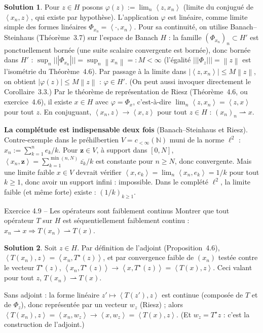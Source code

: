 \documentclass[11pt,a4paper]{article}
\newcommand{\N}{\mathbb{N}}
\newcommand{\norm}[1]{\left\|#1\right\|}
\newcommand{\opnorm}[1]{|\!|\!|#1|\!|\!|}
\newcommand{\ie}{c'est-à-dire}
\newcommand{\ps}[2]{\left\langle #1,#2\right\rangle}
\theoremstyle{definition}
\newtheorem*{solution}{Solution}
\begin{document}
\begin{solution}
Pour $z\in H$ posons $\varphi(z):=\lim_n\ps z{x_n}$ (limite du conjugué de $\ps{x_n}z$, qui existe par hypothèse). L'application $\varphi$ est linéaire, comme limite simple des formes linéaires $\Phi_{x_n}=\ps\cdot{x_n}$. Pour sa continuité, on utilise Banach--Steinhaus (Théorème~3.7) sur l'espace de Banach $H$ : la famille $(\Phi_{x_n})_n\subset H'$ est ponctuellement bornée (une suite scalaire convergente est bornée), donc bornée dans $H'$ : $\sup_n\opnorm{\Phi_{x_n}}=\sup_n\norm{x_n}=:M<\infty$ (l'égalité $\opnorm{\Phi_z}=\norm z$ est l'isométrie du Théorème~4.6). Par passage à la limite dans $|\ps z{x_n}|\le M\norm z$, on obtient $|\varphi(z)|\le M\norm z$ : $\varphi\in H'$. (On peut aussi invoquer directement le Corollaire~3.3.) Par le théorème de représentation de Riesz (Théorème~4.6, ou exercice~4.6), il existe $x\in H$ avec $\varphi=\Phi_x$, \ie{} $\lim_n\ps z{x_n}=\ps zx$ pour tout $z$. En conjuguant, $\ps{x_n}z\to\ps xz$ pour tout $z\in H$ : $(x_n)_n\rightharpoonup x$.
\end{solution}

\begin{piege}
\textbf{La complétude est indispensable deux fois} (Banach--Steinhaus et Riesz). Contre-exemple dans le préhilbertien $V=c_{<\infty}(\N)$ muni de la norme $\ell^2$ : $x_n:=\sum_{k=1}^ne_k/k$. Pour $\mathbf z\in V$, à support dans $[0,N]$, $\ps{x_n}{\mathbf z}=\sum_{k=1}^{\min(n,N)}\overline{z_k}/k$ est constante pour $n\ge N$, donc convergente. Mais une limite faible $x\in V$ devrait vérifier $\ps x{e_k}=\lim_n\ps{x_n}{e_k}=1/k$ pour tout $k\ge1$, donc avoir un support infini : impossible. Dans le complété $\ell^2$, la limite faible (et même forte) existe : $(1/k)_{k\ge1}$.
\end{piege}

\begin{exo}{Exercice 4.9 -- Les opérateurs sont faiblement continus}
Montrer que tout opérateur $T$ sur $H$ est séquentiellement faiblement continu : $x_n\rightharpoonup x\Rightarrow T(x_n)\rightharpoonup T(x)$.
\end{exo}

\begin{solution}
Soit $z\in H$. Par définition de l'adjoint (Proposition~4.6), $\ps{T(x_n)}z=\ps{x_n}{T^\star(z)}$, et par convergence faible de $(x_n)$ testée contre le vecteur $T^\star(z)$, $\ps{x_n}{T^\star(z)}\to\ps x{T^\star(z)}=\ps{T(x)}z$. Ceci valant pour tout $z$, $T(x_n)\rightharpoonup T(x)$.

Sans adjoint : la forme linéaire $z'\mapsto\ps{T(z')}z$ est continue (composée de $T$ et de $\Phi_z$), donc représentée par un vecteur $w_z$ (Riesz) ; alors $\ps{T(x_n)}z=\ps{x_n}{w_z}\to\ps x{w_z}=\ps{T(x)}z$. (Et $w_z=T^\star z$ : c'est la construction de l'adjoint.)
\end{solution}
\end{document}
